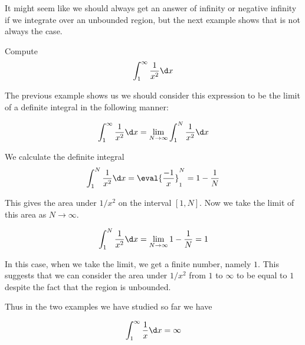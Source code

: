 \documentclass{ximera}
\begin{document}
It might seem like we should always get an answer of infinity or negative infinity if we integrate over an unbounded region, but the next example shows that is not always the case.

\begin{example}
Compute 
\[
\int_{1}^{\infty} \frac{1}{x^{2}} \d x
\]

\begin{explanation}
The previous example shows us we should consider this expression to be the limit of a definite integral 
in the following manner:

\[
\int_{1}^{\infty} \frac{1}{x^{2}} \d x=\lim_{N \to \infty} \int_{1}^{N} \frac{1}{x^{2}} \d x
\]

We calculate the definite integral 
\[
\int_{1}^{N} \frac{1}{x^{2}} \d x= \eval{\frac{-1}{x}}_{1}^{N}=1-\frac{1}{N}
\]

This gives the area under $1/x^{2}$ on the interval $[1, N]$. Now we take the limit of this area as $N \to \infty$. 

\[
\int_{1}^{N} \frac{1}{x^{2}} \d x= \lim_{N \to \infty} 1-\frac{1}{N}=1
\]
  
In this case, when we take the limit, we get a finite number, namely $1$. This suggests that we can consider the 
area under $1/x^{2}$ from $1$ to $\infty$ to be equal to $1$ despite the fact that the region is unbounded. 



\end{explanation}
\end{example}






%



Thus in the two examples we have studied so far we have 


\[
\int_{1}^{\infty} \frac{1}{x} \d x = \infty
\]
\end{document}
